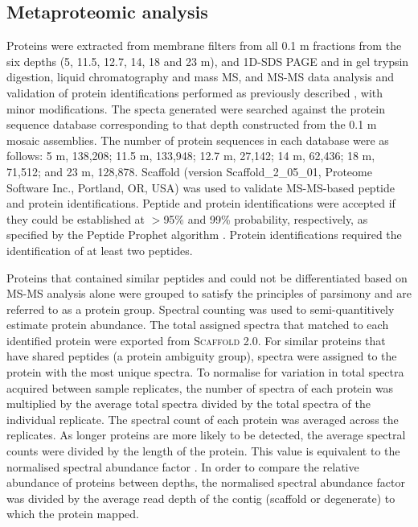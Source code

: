\subsection{Metaproteomic analysis}
Proteins were extracted from membrane filters from all 0.1 \textmu{}m fractions from the six depths (5, 11.5, 12.7, 14, 18 and 23 m), and \ac{1D-SDS PAGE} and in gel trypsin digestion, liquid chromatography and mass \ac{MS}, and \ac{MS-MS} data analysis and validation of protein identifications performed as previously described \cite{Ng2010a}, with minor modifications.
The specta generated were searched against the protein sequence database corresponding to that depth constructed from the 0.1 \textmu{}m mosaic assemblies. 
The number of protein sequences in each database were as follows: 5 m, 138,208; 11.5 m, 133,948; 12.7 m, 27,142; 14 m, 62,436; 18 m, 71,512; and 23 m, 128,878. 
Scaffold (version Scaffold\_2\_05\_01, Proteome Software Inc., Portland, \textsc{OR}, \textsc{USA}) was used to validate \ac{MS-MS}-based peptide and protein identifications. 
Peptide and protein identifications were accepted if they could be established at $>$95\% and 99\% probability, respectively, as specified by the Peptide Prophet algorithm \cite{Keller2002}. 
Protein identifications required the identification of at least two peptides.
 
Proteins that contained similar peptides and could not be differentiated based on \ac{MS-MS} analysis alone were grouped to satisfy the principles of parsimony and are referred to as a protein group. 
Spectral counting was used to semi-quantitively estimate protein abundance. 
The total assigned spectra that matched to each identified protein were exported from \textsc{Scaffold} 2.0. 
For similar proteins that have shared peptides (a protein ambiguity group), spectra were assigned to the protein with the most unique spectra. 
To normalise for variation in total spectra acquired between sample replicates, the number of spectra of each protein was multiplied by the average total spectra divided by the total spectra of the individual replicate. 
The spectral count of each protein was averaged across the replicates. 
As longer proteins are more likely to be detected, the average spectral counts were divided by the length of the protein. 
This value is equivalent to the normalised spectral abundance factor \cite{Florens2006, Zybailov2006}. 
In order to compare the relative abundance of proteins between depths, the normalised spectral abundance factor was divided by the average read depth of the contig (scaffold or degenerate) to which the protein mapped. 

